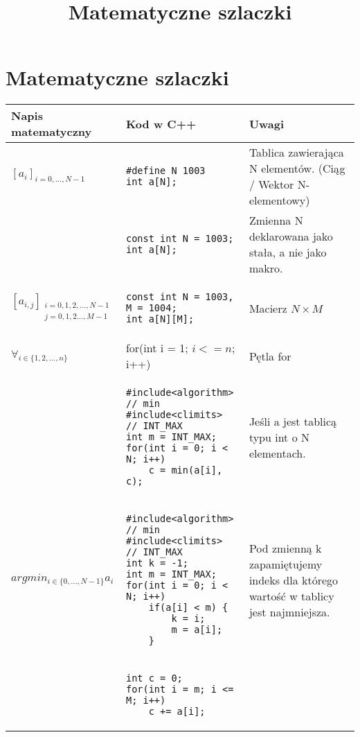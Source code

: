 \documentclass{article}
\begin{document}
\title{Matematyczne szlaczki}

\maketitle

\section{Matematyczne szlaczki}
\begin{tabular}{ | l | l | m{3cm} | }
\hline
Napis matematyczny & Kod w C++ & Uwagi \\
\hline
$[a_{i}]_{i = 0, \dots, N-1 }$ &
\begin{lstlisting}
#define N 1003
int a[N];
\end{lstlisting}
& Tablica zawierająca N elementów. (Ciąg / Wektor N-elementowy) \\
& \begin{lstlisting}
const int N = 1003;
int a[N];
\end{lstlisting}

& Zmienna N deklarowana jako stała, a nie jako makro.\\
\hline

$[a_{i, j}]_{\substack{ i = 0, 1, 2, \dots, N-1 \\ j = 0, 1, 2 \dots, M-1}} $
& 
\begin{lstlisting}
const int N = 1003, M = 1004;
int a[N][M];
\end{lstlisting}
& Macierz $ N\times M $ \\
\hline

$ \forall_{i \in \{1, 2, \dots, n\}} $ & for(int i = 1; $ i <= n $; i++) & Pętla for \\
\hline

\begin{comment}
$ min_{i \in \{0, \dots, N-1\}} a_{i} $ & 
\begin{lstlisting}
#include<algorithm> // min
#include<climits> // INT_MAX
int m = INT_MAX;
for(int i = 0; i < N; i++)
	c = min(a[i], c);
\end{lstlisting}
& Jeśli a jest tablicą typu int o N elementach. \\
\hline
$ argmin_{i \in \{0, \dots, N-1\}} a_i $ &
\begin{lstlisting}
#include<algorithm> // min
#include<climits> // INT_MAX
int k = -1;
int m = INT_MAX;
for(int i = 0; i < N; i++)
	if(a[i] < m) {
		k = i;
		m = a[i];
	}
\end{lstlisting} & Pod zmienną k zapamiętujemy indeks dla którego wartość w tablicy jest najmniejsza. \\
\hline
\end{comment}
$
\sum_{i \in \{m, m+1, \dots, M \} } a_i
$
&
\begin{lstlisting}
int c = 0;
for(int i = m; i <= M; i++)
	c += a[i];
\end{lstlisting}


\end{tabular}
\end{document}

